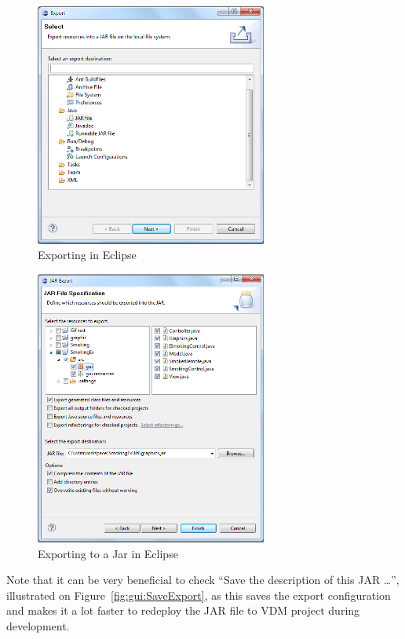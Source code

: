 \documentclass{overturerepchap}
\begin{document}
\begin{figure}[h]
\begin{center}
  \includegraphics[width=3in]{figures/SmokersExport}
  \caption[labelInTOC]{Exporting in Eclipse}
  \label{fig:gui:EclipseExport}
\end{center}
\end{figure}

\begin{figure}[h]
\begin{center}
  \includegraphics[width=3in]{figures/SmokersJarExport}
  \caption[labelInTOC]{Exporting to a Jar in Eclipse}
  \label{fig:gui:JarExport}
\end{center}
\end{figure}

Note that it can be very beneficial to check ``Save the description of this JAR …'', illustrated on Figure~\ref{fig:gui:SaveExport}, as this saves the export configuration and makes it a lot faster to redeploy the JAR file to VDM project during development.  \\
\end{document}
